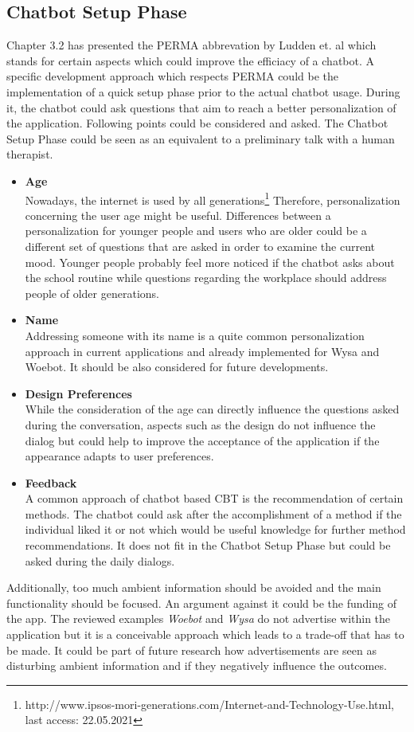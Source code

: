 \documentclass[sigconf, nonacm]{acmart}
\begin{document}
\subsection{Chatbot Setup Phase}
Chapter 3.2 has presented the PERMA abbrevation by Ludden et. al \cite{Ludden2015} which stands for certain aspects which could improve the efficiacy of a chatbot. A specific development approach which respects PERMA could be the implementation of a quick setup phase prior to the actual chatbot usage.
During it, the chatbot could ask questions that aim to reach a better personalization of the application. Following points could be considered and asked. The Chatbot Setup Phase could be seen as an equivalent to a preliminary talk with a human therapist.
\\
\begin{itemize}
\item\textbf{Age}\\ 
Nowadays, the internet is used by all generations\footnote{http://www.ipsos-mori-generations.com/Internet-and-Technology-Use.html, last access: 22.05.2021}
Therefore, personalization concerning the user age might be useful. Differences between a personalization for younger people and users who are older could be a different set of questions that are asked in order to examine the current mood.
Younger people probably feel more noticed if the chatbot asks about the school routine while questions regarding the workplace should address people of older generations.
\\
\item\textbf{Name}\\
Addressing someone with its name is a quite common personalization approach in current applications and already implemented for Wysa and Woebot. It should be also considered for future developments.
\\
\item\textbf{Design Preferences}\\
While the consideration of the age can directly influence the questions asked during the conversation, aspects such as the design do not influence the dialog but could help to improve the acceptance of the application if the appearance adapts to user preferences. 
\\
\item\textbf{Feedback}\\
A common approach of chatbot based CBT is the recommendation of certain methods. The chatbot could ask after the accomplishment of a method if the individual liked it or not which would be useful knowledge for further method recommendations. It does not fit in the Chatbot Setup Phase but could
be asked during the daily dialogs.
\end{itemize} 
Additionally, too much ambient information should be avoided and the main functionality should be focused. An argument against it could be the funding of the app. The reviewed examples \emph{Woebot} and \emph{Wysa} do not advertise within the application but it is a conceivable approach which leads 
to a trade-off that has to be made. It could be part of future research how advertisements are seen as disturbing ambient information and if they negatively influence the outcomes. 
\\
\end{document}
